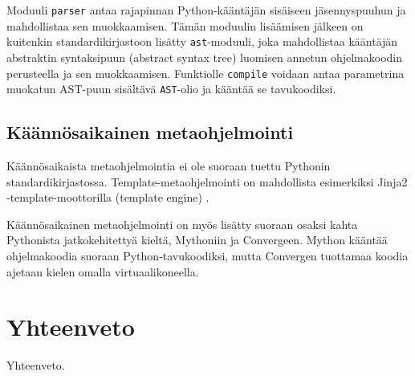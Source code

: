 \documentclass[finnish]{tktltiki2}
\theoremstyle{definition}
\theoremstyle{remark}
\begin{document}
Moduuli \verb|parser| antaa rajapinnan Python-kääntäjän sisäiseen jäsennyspuuhun ja mahdollistaa sen muokkaamisen. Tämän moduulin lisäämisen jälkeen on kuitenkin standardikirjastoon lisätty \verb|ast|-moduuli, joka mahdollistaa kääntäjän abstraktin syntaksipuun (abstract syntax tree) luomisen annetun ohjelmakoodin perusteella ja sen muokkaamisen. Funktiolle \verb|compile| voidaan antaa parametrina muokatun AST-puun sisältävä \verb|AST|-olio ja kääntää se tavukoodiksi.

\subsection{Käännösaikainen metaohjelmointi}

Käännösaikaista metaohjelmointia ei ole suoraan tuettu Pythonin standardikirjastossa. Template-metaohjelmointi on mahdollista esimerkiksi Jinja2 -template-moottorilla (template engine) \cite{jinja}.

Käännösaikainen metaohjelmointi on myös lisätty suoraan osaksi kahta Pythonista jatkokehitettyä kieltä, Mythoniin\cite{mython} ja Convergeen\cite{tratt05}. Mython kääntää ohjelmakoodia suoraan Python-tavukoodiksi, mutta Convergen tuottamaa koodia ajetaan kielen omalla virtuaalikoneella.


\section{Yhteenveto}

Yhteenveto.


\pagebreak

%
%
% 
%




\lastpage
\end{document}
